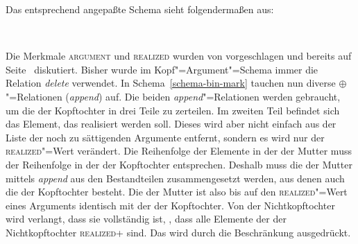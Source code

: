 {Das entsprechend angepaßte Schema sieht folgendermaßen aus:
\begin{samepage}
\begin{schema}
\label{schema-bin-mark}
 \impl\\
\end{schema}
\end{samepage}

\noindent
Die Merkmale \textsc{argument} und \textsc{realized} wurden von \citet{Prze99} vorgeschlagen
und bereits auf Seite~\pageref{page-realized} diskutiert. Bisher wurde im Kopf"=Argument"=Schema
immer die Relation \emph{delete} verwendet. In Schema~\ref{schema-bin-mark} tauchen nun
diverse $\oplus$"=Relationen (\emph{append}) auf. Die beiden \emph{append}"=Relationen
werden gebraucht, um die \compsl der Kopftochter in drei Teile zu zerteilen. Im zweiten
Teil befindet sich das Element, das realisiert werden soll. Dieses wird aber nicht einfach
aus der Liste der noch zu sättigenden Argumente entfernt, sondern es wird nur der 
\textsc{realized}"=Wert verändert. Die Reihenfolge der Elemente in der \compsl der Mutter
muss der Reihenfolge in der \compsl der Kopftochter entsprechen. Deshalb muss
die \compsl der Mutter mittels \emph{append}
aus den Bestandteilen zusammengesetzt werden, aus denen auch die \compsl der Kopftochter
besteht. Die \compsl der Mutter ist also bis auf den \textsc{realized}"=Wert eines Arguments
identisch mit der \compsl der Kopftochter. Von der Nichtkopftochter wird verlangt, dass sie
vollständig ist, \dash, dass alle Elemente der \compsl der Nichtkopftochter \textsc{realized}+
sind. Das wird durch die Beschränkung  ausgedrückt. 

}
